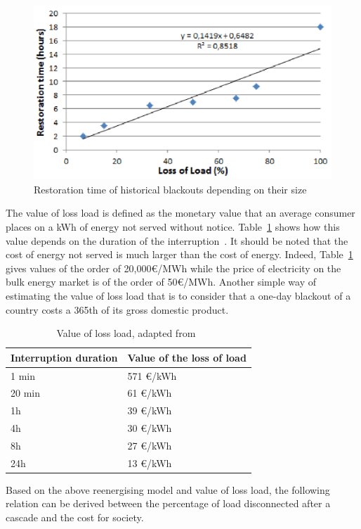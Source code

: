 \begin{figure}
    \centering
    \includegraphics[width=0.6\linewidth]{Figs/RestorationTime.png}
    \caption{Restoration time of historical blackouts depending on their size~\cite{TwoLevelPSA}}
    \label{fig:restoration_time}
\end{figure}

The value of loss load is defined as the monetary value that an average consumer places on a kWh of energy not served without notice. Table~\ref{tab:VOLL} shows how this value depends on the duration of the interruption~\cite{VOLL}. It should be noted that the cost of energy not served is much larger than the cost of energy. Indeed, Table~\ref{tab:VOLL} gives values of the order of 20,000€/MWh while the price of electricity on the bulk energy market is of the order of 50€/MWh. Another simple way of estimating the value of loss load that is to consider that a one-day blackout of a country costs a 365th of its gross domestic product.

\begin{table}
    \centering
    \caption{Value of loss load, adapted from~\cite{VOLL}}
    \label{tab:VOLL}
    \begin{tabular}{@{}ll@{}}
    \toprule
    Interruption duration & Value of the loss of load \\ \midrule
    1 min  & 571 €/kWh \\
    20 min & 61 €/kWh \\
    1h     & 39 €/kWh \\
    4h     & 30 €/kWh \\
    8h     & 27 €/kWh \\
    24h    & 13 €/kWh \\ \bottomrule
    \end{tabular}
\end{table}

Based on the above reenergising model and value of loss load, the following relation can be derived between the percentage of load disconnected after a cascade and the cost for society.

